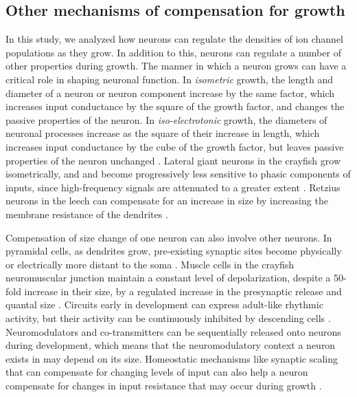 \documentclass[9pt,lineno]{elife}
\begin{document}
\subsection{Other mechanisms of compensation for growth}

In this study, we analyzed how neurons can regulate the densities of ion channel populations as they grow. In addition to this, neurons can regulate a number of other properties during growth. The manner in which a neuron grows can have a critical role in shaping neuronal function. In \emph{isometric} growth, the length and diameter of a neuron or neuron component increase by the same factor, which increases input conductance by the square of the growth factor, and changes the passive properties of the neuron. In \emph{iso-electrotonic} growth, the diameters of neuronal processes increase as the square of their increase in length, which increases input conductance by the cube of the growth factor, but leaves passive properties of the neuron unchanged \citep{Olsen:1996im}. Lateral giant neurons in the crayfish grow isometrically, and and become progressively less sensitive to phasic components of inputs, since high-frequency signals are attenuated to a greater extent \citep{Edwards:omEiAjTW, Edwards:OcB8a57D}. Retzius neurons in the leech can compensate for an increase in size by increasing the membrane resistance of the dendrites \citep{DeLaRosaTovar:2016ed}.

Compensation of size change of one neuron can also involve other neurons. In pyramidal cells, as dendrites grow, pre-existing synaptic sites become physically or electrically more distant to the soma \citep{Davis:2003ev, Stuart:1995cz}. Muscle cells in the crayfish neuromuscular junction maintain a constant level of  depolarization, despite a 50-fold increase in their size, by a regulated increase in the presynaptic release and quantal size \citep{Pulver:2004ic, Davis:2003ev, Lnenicka:1983ib}. Circuits early in development can express adult-like rhythmic activity, but their activity can be continuously inhibited by descending cells \citep{Fenelon:Dh60FeLw,Humphreys:2018ta, Bentley:1970kp}. Neuromodulators and co-transmitters \citep{Fenelon:1999vn, Kilman:1999vr} can be sequentially released onto neurons during development, which means that the neuromodulatory context a neuron exists in may depend on its size. Homeostatic mechanisms like synaptic scaling that can compensate for changing levels of input can also help a neuron compensate for changes in input resistance that may occur during growth \citep{Turrigiano:2012hw, Turrigiano:2007bl}. 
\end{document}
